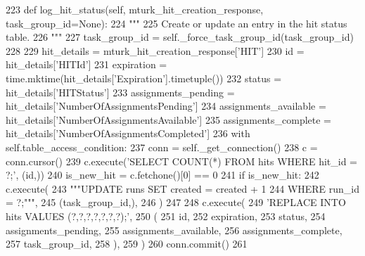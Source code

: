 \begin{DoxyCode}
223     \textcolor{keyword}{def }log\_hit\_status(self, mturk\_hit\_creation\_response, task\_group\_id=None):
224         \textcolor{stringliteral}{"""}
225 \textcolor{stringliteral}{        Create or update an entry in the hit status table.}
226 \textcolor{stringliteral}{        """}
227         task\_group\_id = self.\_force\_task\_group\_id(task\_group\_id)
228 
229         hit\_details = mturk\_hit\_creation\_response[\textcolor{stringliteral}{'HIT'}]
230         id = hit\_details[\textcolor{stringliteral}{'HITId'}]
231         expiration = time.mktime(hit\_details[\textcolor{stringliteral}{'Expiration'}].timetuple())
232         status = hit\_details[\textcolor{stringliteral}{'HITStatus'}]
233         assignments\_pending = hit\_details[\textcolor{stringliteral}{'NumberOfAssignmentsPending'}]
234         assignments\_available = hit\_details[\textcolor{stringliteral}{'NumberOfAssignmentsAvailable'}]
235         assignments\_complete = hit\_details[\textcolor{stringliteral}{'NumberOfAssignmentsCompleted'}]
236         with self.table\_access\_condition:
237             conn = self.\_get\_connection()
238             c = conn.cursor()
239             c.execute(\textcolor{stringliteral}{'SELECT COUNT(*) FROM hits WHERE hit\_id = ?;'}, (id,))
240             is\_new\_hit = c.fetchone()[0] == 0
241             \textcolor{keywordflow}{if} is\_new\_hit:
242                 c.execute(
243                     \textcolor{stringliteral}{"""UPDATE runs SET created = created + 1}
244 \textcolor{stringliteral}{                             WHERE run\_id = ?;"""},
245                     (task\_group\_id,),
246                 )
247 
248             c.execute(
249                 \textcolor{stringliteral}{'REPLACE INTO hits VALUES (?,?,?,?,?,?,?);'},
250                 (
251                     id,
252                     expiration,
253                     status,
254                     assignments\_pending,
255                     assignments\_available,
256                     assignments\_complete,
257                     task\_group\_id,
258                 ),
259             )
260             conn.commit()
261 
\end{DoxyCode}
\mbox{\label{classparlai_1_1mturk_1_1core_1_1legacy__2018_1_1mturk__data__handler_1_1MTurkDataHandler_a0bc9f338e92aa4c1dc7a0f09e743b01e}} 
